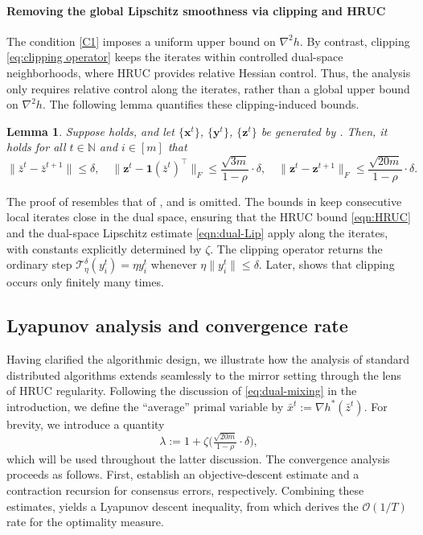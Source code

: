 \documentclass{article}
\theoremstyle{plain}
\newtheorem{lemma}[theorem]{Lemma}
\theoremstyle{definition}
\theoremstyle{remark}
\newcommand{\clip}{\mathcal{T}^\delta_\eta}
\newcommand{\N}{\mathbb{N}}
\newcommand{\cO}{\mathcal O}
\newcommand{\one}{\mathbf{1}}
\newcommand{\bx}{\mathbf{x}}
\newcommand{\by}{\mathbf{y}}
\newcommand{\bz}{\mathbf{z}}
\begin{document}
\paragraph{Removing the global Lipschitz smoothness via clipping and HRUC}
The condition \ref{C1} imposes a uniform upper bound on $\nabla^2h$. By contrast, clipping \eqref{eq:clipping operator} keeps the iterates within controlled dual-space neighborhoods, where HRUC provides relative Hessian control. Thus, the analysis only requires relative control along the iterates, rather than a global upper bound on $\nabla^2h$. The following lemma quantifies these clipping-induced bounds.

\begin{lemma}
\label{lem:iterates bounds}
Suppose  holds, and let $\{\bx^t\}$, $\{\by^t\}$, $\{\bz^t\}$ be generated by . Then, it holds for all $t\in\N$ and $i\in[m]$ that
 \[
    \|\bar z^t - \bar z^{t+1}\| \leq \delta,\quad \|\bz^{t} - \one (\bar z^{t})^\top\|_F \leq \frac{\sqrt{3m}}{1-\rho}\cdot \delta, \quad \|\bz^t - \bz^{t+1}\|_F\leq \frac{\sqrt{20m}}{1-\rho}\cdot \delta. 
\]
\end{lemma} 
The proof of  resembles that of \cite[Lemma 5.4]{hong2022divergence}, and is omitted. The bounds in  keep consecutive local iterates close in the dual space, ensuring that the HRUC bound \eqref{eqn:HRUC} and the dual-space Lipschitz estimate \eqref{eqn:dual-Lip} apply along the iterates, with constants explicitly determined by $\zeta$. The clipping operator returns the ordinary step $\clip(y_i^t)=\eta y_i^t$ whenever $\eta\|y_i^t\|\leq\delta$. Later,  shows that clipping occurs only finitely many times.  
 
\subsection{Lyapunov analysis and convergence rate}
Having clarified the algorithmic design, we illustrate how the analysis of standard distributed algorithms extends seamlessly to the mirror setting through the lens of HRUC regularity. Following the discussion of \eqref{eq:dual-mixing} in the introduction, we define the ``average'' primal variable by $\bar x^t:=\nabla h^*(\bar z^t)$. For brevity, we introduce a quantity
\begin{equation}
\label{defn:lambda}
\lambda:=1+\zeta\Big(\tfrac{\sqrt{20m}}{1-\rho}\cdot \delta\Big),
\end{equation}
which will be used throughout the latter discussion. The convergence analysis proceeds as follows. First,  establish an objective-descent estimate and a contraction recursion for consensus errors, respectively. Combining these estimates,  yields a Lyapunov descent inequality, from which  derives the $\cO(1/T)$ rate for the optimality measure.  
\end{document}
